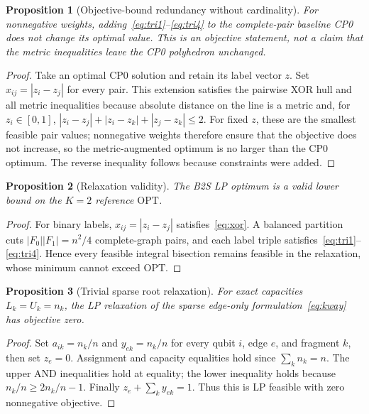 \documentclass[
  aps,
  pra,
  reprint,
  amsmath,
  amssymb,
  longbibliography,
  nofootinbib,
  floatfix
]{revtex4-2}
\theoremstyle{plain}
\newtheorem{proposition}{Proposition}
\newcommand{\OPT}{\mathrm{OPT}}
\begin{document}
\begin{proposition}[Objective-bound redundancy without cardinality]\label{prop:redundancy}
For nonnegative weights, adding~\eqref{eq:tri1}--\eqref{eq:tri4} to the complete-pair baseline CP0 does not change its optimal value. This is an objective statement, not a claim that the metric inequalities leave the CP0 polyhedron unchanged.
\end{proposition}
\begin{proof}
Take an optimal CP0 solution and retain its label vector $z$. Set $x_{ij}=|z_i-z_j|$ for every pair. This extension satisfies the pairwise XOR hull and all metric inequalities because absolute distance on the line is a metric and, for $z_i\in[0,1]$, $|z_i-z_j|+|z_i-z_k|+|z_j-z_k|\leq2$. For fixed $z$, these are the smallest feasible pair values; nonnegative weights therefore ensure that the objective does not increase, so the metric-augmented optimum is no larger than the CP0 optimum. The reverse inequality follows because constraints were added.
\end{proof}

\begin{proposition}[Relaxation validity]\label{prop:relax-valid}
The B2S LP optimum is a valid lower bound on the $K=2$ reference $\OPT$.
\end{proposition}
\begin{proof}
For binary labels, $x_{ij}=|z_i-z_j|$ satisfies~\eqref{eq:xor}. A balanced partition cuts $|F_0||F_1|=n^2/4$ complete-graph pairs, and each label triple satisfies~\eqref{eq:tri1}--\eqref{eq:tri4}. Hence every feasible integral bisection remains feasible in the relaxation, whose minimum cannot exceed $\OPT$.
\end{proof}

\begin{proposition}[Trivial sparse root relaxation]\label{prop:trivial-root}
For exact capacities $L_k=U_k=n_k$, the LP relaxation of the sparse edge-only formulation~\eqref{eq:kway} has objective zero.
\end{proposition}
\begin{proof}
Set $a_{ik}=n_k/n$ and $y_{ek}=n_k/n$ for every qubit $i$, edge $e$, and fragment $k$, then set $z_e=0$. Assignment and capacity equalities hold since $\sum_kn_k=n$. The upper AND inequalities hold at equality; the lower inequality holds because $n_k/n\geq2n_k/n-1$. Finally $z_e+\sum_ky_{ek}=1$. Thus this is LP feasible with zero nonnegative objective.
\end{proof}
\end{document}
